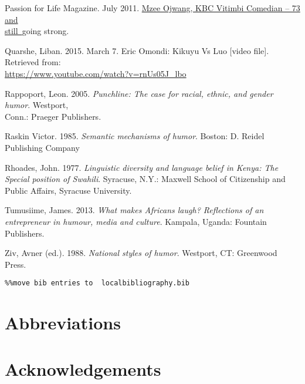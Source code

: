 \documentclass[output=paper]{langsci/langscibook}
\begin{document}
Passion for Life Magazine. July 2011. \href{http://www.kenyanmagazines.com/mzee-ojwang-kbc-vitimbi-comedian/}{Mzee Ojwang, KBC Vitimbi Comedian – 73 and \\
   still~}going strong. 

Quarshe, Liban. 2015. March 7. Eric Omondi: Kikuyu Vs Luo [video file]. Retrieved from: \\
   \url{https://www.youtube.com/watch?v=rnUs05J_lbo}

Rappoport, Leon. 2005. \textit{Punchline: The case for racial, ethnic, and gender humor}. Westport, \\
   Conn.: Praeger Publishers.

Raskin Victor. 1985. \textit{Semantic mechanisms of humor}. Boston: D. Reidel Publishing Company

Rhoades, John. 1977. \textit{Linguistic diversity and language belief in Kenya: The Special position of Swahili}. Syracuse, N.Y.: Maxwell School of Citizenship and Public Affairs, Syracuse University.

Tumusiime, James. 2013. \textit{What makes Africans laugh? Reflections of an entrepreneur in humour, media and culture}. Kampala, Uganda: Fountain Publishers.

Ziv, Avner (ed.). 1988. \textit{National styles of humor}. Westport, CT: Greenwood Press.


\begin{verbatim}%%move bib entries to  localbibliography.bib
\end{verbatim}

\section*{Abbreviations}
\section*{Acknowledgements}

\printbibliography[heading=subbibliography,notkeyword=this]
\end{document}

